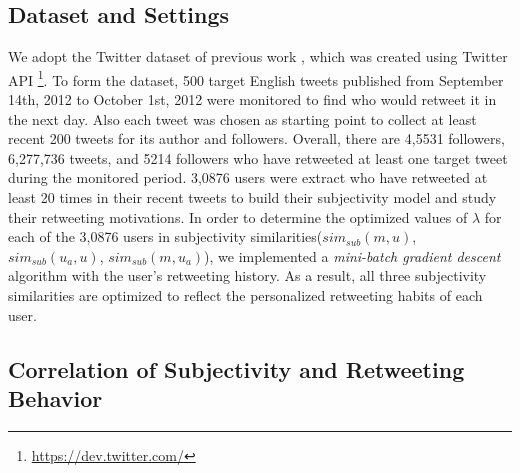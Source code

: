 \documentclass[letterpaper]{article}
\begin{document}
\subsection{Dataset and Settings}
We adopt the Twitter dataset of previous work \cite{Luo:2013RMF}, which was created using Twitter API \footnote{\url{https://dev.twitter.com/}}. 
To form the dataset, 500 target English tweets published from September 14th, 2012 to October 1st, 2012 were monitored to find who would retweet it in the next day. 
Also each tweet was chosen as starting point to collect at least recent 200 tweets for its author and followers.
Overall, there are 4,5531 followers, 6,277,736 tweets, and 5214 followers who have retweeted at least one target tweet during the monitored period. 
3,0876 users were extract who have retweeted at least 20 times in their recent tweets to build their subjectivity model and study their retweeting motivations. 
In order to determine the optimized values of $ \lambda $ for each of the 3,0876 users in subjectivity similarities($ sim_{sub} \left( m,u \right) $, $ sim_{sub}\left( u_{a},u \right)  $, $ sim_{sub}\left( m,u_{a} \right)  $), we implemented a \textit{mini-batch gradient descent} algorithm with the user's retweeting history. As a result, all three subjectivity similarities are optimized to reflect the personalized retweeting habits of each user.

\subsection{Correlation of Subjectivity and Retweeting Behavior}
\end{document}

